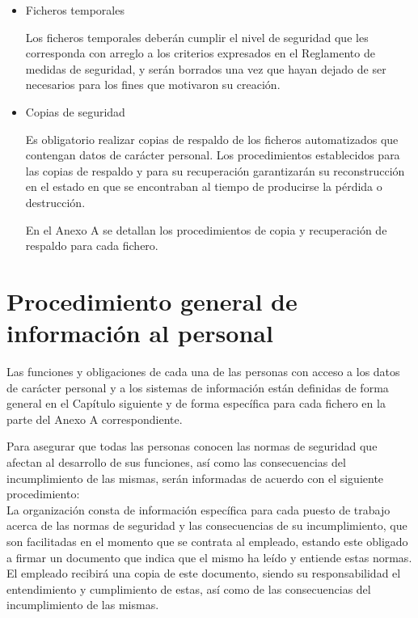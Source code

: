 \documentclass[a4paper,11pt,bibtotoc,noliststotoc]{scrbook}
\begin{document}
\begin{itemize}
\item Ficheros temporales

Los ficheros temporales deberán cumplir el nivel de seguridad que les corresponda con arreglo a los criterios expresados en el Reglamento de medidas de seguridad, y serán borrados una vez que hayan dejado de ser necesarios para los fines que motivaron su creación.


\item Copias de seguridad

Es obligatorio realizar copias de respaldo de los ficheros automatizados que contengan datos de carácter personal. Los procedimientos establecidos para las copias de respaldo y para su recuperación garantizarán su reconstrucción en el estado en que se encontraban al tiempo de producirse la pérdida o destrucción.

En el Anexo A se detallan los procedimientos de copia y recuperación de respaldo para cada fichero.

\end{itemize}






\chapter{Procedimiento general de información al personal}

Las funciones y obligaciones de cada una de las personas con acceso a los datos de carácter personal y a los sistemas de información están definidas de forma general en el Capítulo siguiente y de forma específica para cada fichero en la parte del Anexo A correspondiente.

Para asegurar que todas las personas conocen las normas de seguridad que afectan al desarrollo de sus funciones, así como las consecuencias del incumplimiento de las mismas, serán informadas de acuerdo con el siguiente procedimiento: \\
La organización consta de información específica para cada puesto de trabajo acerca de las normas de seguridad y las consecuencias de su incumplimiento, que son facilitadas en el momento que se contrata al empleado, estando este obligado a firmar un documento que indica que el mismo ha leído y entiende estas normas. El empleado recibirá una copia de este documento, siendo su responsabilidad el entendimiento y cumplimiento de estas, así como de las consecuencias del incumplimiento de las mismas.
\end{document}
